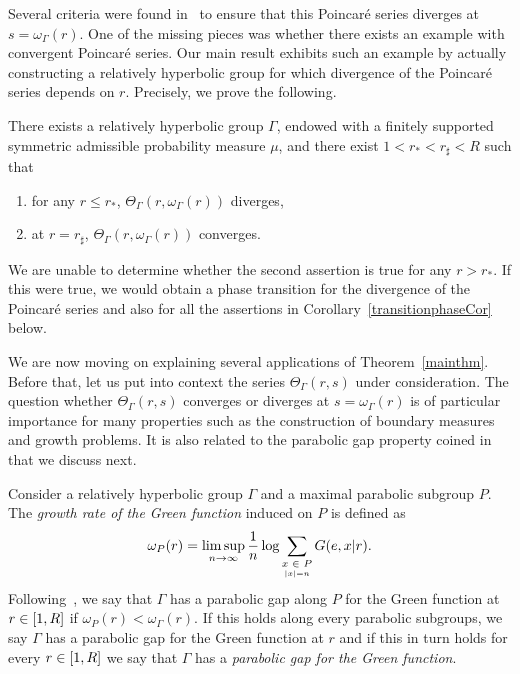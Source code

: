 \documentclass[AHL,Unicode,longabstracts]{cedram}
\let\oldin\in
\renewcommand{\in}{\mathchoice{\oldin}{\oldin}{\,\oldin\,}{\,\oldin\,}}
\renewcommand*{\to}{\mathchoice{\longrightarrow}{\rightarrow}{\rightarrow}{\rightarrow}}
\begin{document}
Several criteria were found in~\cite{DWY} to ensure that this Poincaré series diverges at $s=\omega_\Gamma(r)$. One of the missing pieces was whether there exists an example with convergent Poincaré series. Our main result exhibits such an example by actually constructing a relatively hyperbolic group for which divergence of the Poincaré series depends on $r$. Precisely, we prove the following.

\begin{theo}\label{mainthm}
There exists a relatively hyperbolic group $\Gamma$, endowed with a finitely supported symmetric admissible probability measure $\mu$, and there exist $1<r_*<r_\sharp<R$ such that
\begin{enumerate}
\item\label{theo1.1.1} for any $r\leq r_*$, $\Theta_\Gamma(r,\omega_\Gamma(r))$ diverges,
\item\label{theo1.1.2} at $r=r_\sharp$, $\Theta_\Gamma(r,\omega_\Gamma(r))$ converges.
\end{enumerate}
\end{theo}

\begin{rema}
We are unable to determine whether the second assertion is true for any $r>r_*$. If this were true, we would obtain a phase transition for the divergence of the Poincaré series and also for all the assertions in Corollary~\ref{transitionphaseCor} below.
\end{rema}

We are now moving on explaining several applications of Theorem~\ref{mainthm}. Before that, let us put into context the series $\Theta_\Gamma(r,s)$ under consideration. The question whether $\Theta_\Gamma(r,s)$ converges or diverges at $s=\omega_\Gamma(r)$ is of particular importance for many properties such as the construction of boundary measures and growth problems. It is also related to the parabolic gap property coined in~\cite{DWY} that we discuss next.


Consider a relatively hyperbolic group $\Gamma$ and a maximal parabolic subgroup $P$. The \emph{growth rate of the Green function} induced on $P$ is defined as
\[
\omega_P(r)=\limsup_{n\to\infty}\frac{1}{n}\log \sum_{\underset{|x|=n}{x\in P}}G(e,x|r).
\]
Following~\cite{DWY}, we say that $\Gamma$ has a {parabolic gap along $P$ for the Green function} at $r\in[1,R]$ if $\omega_P(r)<\omega_\Gamma(r)$. If this holds along every parabolic subgroups, we say $\Gamma$ has a {parabolic gap for the Green function} at $r$ and if this in turn holds for every $r\in [1,R]$ we say that $\Gamma$ has a \emph{parabolic gap for the Green function}.
\end{document}

